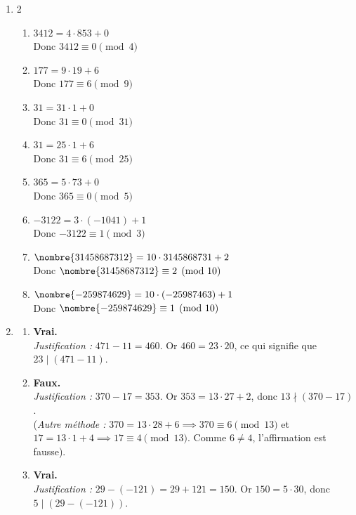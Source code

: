 \begin{enumerate}[label=\thechapter.\arabic*, font=\bfseries, itemsep=7mm,labelsep*=3mm,left=0mm]
\item 
\begin{multicols}{2}
	\begin{enumerate}[label=\roman*),itemsep=5mm,left=-1mm,labelsep*=2mm]
		\item $3412=4\cdot 853+0$\\
		Donc $3412\equiv 0 \pmod{4}$
		\item $177=9\cdot 19+6$\\
		Donc $177\equiv 6 \pmod{9}$
		\item $31=31\cdot 1+0$\\
		Donc $31\equiv 0 \pmod{31}$
		\item $31=25\cdot 1+6$\\
		Donc $31\equiv 6 \pmod{25}$
		\item $365=5\cdot 73+0$\\
		Donc $365\equiv 0 \pmod{5}$
		\item $-3122=3\cdot (-1041)+1$\\
		Donc $-3122\equiv 1 \pmod{3}$
		\item $\nombre{31458687312}=10\cdot 3145868731+2$\\
		Donc $\nombre{31458687312}\equiv 2 \pmod{10}$
		\item $\nombre{-259874629}=10\cdot (-25987463)+1$\\
		Donc $\nombre{-259874629}\equiv 1 \pmod{10}$
	\end{enumerate}
\end{multicols}

\item 
\begin{enumerate}[label=\roman*),itemsep=5mm,left=-1mm,labelsep*=2mm]
	\item[\textbf{a)}] \textbf{Vrai.} \\
	\textit{Justification :} $471 - 11 = 460$. Or $460 = 23 \cdot 20$, ce qui signifie que $23 \mid (471 - 11)$.
	
	\item[\textbf{b)}] \textbf{Faux.} \\
	\textit{Justification :} $370 - 17 = 353$. Or $353 = 13 \cdot 27 + 2$, donc $13 \nmid (370 - 17)$. \\
	(\textit{Autre méthode :} $370 = 13 \cdot 28 + 6 \implies 370 \equiv 6 \pmod {13}$ et $17 = 13 \cdot 1 + 4 \implies 17 \equiv 4 \pmod {13}$. Comme $6 \neq 4$, l'affirmation est fausse).
	
	\item[\textbf{c)}] \textbf{Vrai.} \\
	\textit{Justification :} $29 - (-121) = 29 + 121 = 150$. Or $150 = 5 \cdot 30$, donc $5 \mid (29 - (-121))$.
	

\end{enumerate}
\end{enumerate}
